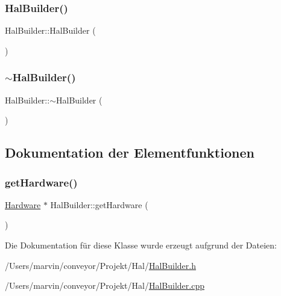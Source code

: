 \subsubsection{\texorpdfstring{Hal\+Builder()}{HalBuilder()}}
{\footnotesize\ttfamily Hal\+Builder\+::\+Hal\+Builder (\begin{DoxyParamCaption}{ }\end{DoxyParamCaption})}

\hypertarget{class_hal_builder_af77e28e213c8aa028b18cf435e9ef3c8}{}\label{class_hal_builder_af77e28e213c8aa028b18cf435e9ef3c8} 
\subsubsection{\texorpdfstring{$\sim$\+Hal\+Builder()}{~HalBuilder()}}
{\footnotesize\ttfamily Hal\+Builder\+::$\sim$\+Hal\+Builder (\begin{DoxyParamCaption}{ }\end{DoxyParamCaption})\hspace{0.3cm}{\ttfamily [virtual]}}



\subsection{Dokumentation der Elementfunktionen}
\hypertarget{class_hal_builder_addc8f400dfa9dee3f0d9de116512212f}{}\label{class_hal_builder_addc8f400dfa9dee3f0d9de116512212f} 
\subsubsection{\texorpdfstring{get\+Hardware()}{getHardware()}}
{\footnotesize\ttfamily \hyperlink{class_hardware}{Hardware} $\ast$ Hal\+Builder\+::get\+Hardware (\begin{DoxyParamCaption}{ }\end{DoxyParamCaption})}



Die Dokumentation für diese Klasse wurde erzeugt aufgrund der Dateien\+:\begin{DoxyCompactItemize}
\item 
/\+Users/marvin/conveyor/\+Projekt/\+Hal/\hyperlink{_hal_builder_8h}{Hal\+Builder.\+h}\item 
/\+Users/marvin/conveyor/\+Projekt/\+Hal/\hyperlink{_hal_builder_8cpp}{Hal\+Builder.\+cpp}\end{DoxyCompactItemize}
